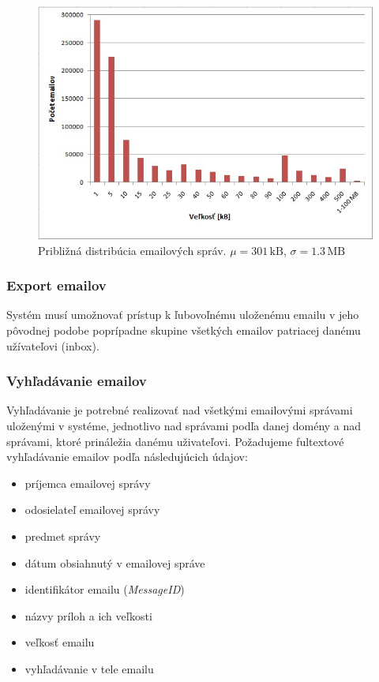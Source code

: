 \documentclass[11pt,twoside,a4paper]{book}
\begin{document}
\begin{figure}[h]
 \centering
 \includegraphics[width=12cm]{./figures/emailsHist.png}
 \caption{Približná distribúcia emailových správ. $\mu = 301\,\mathrm{kB}$, $\sigma = 1.3\,\mathrm{MB}$}
 \label{fig:emailHist}
\end{figure}


\subsubsection*{Export emailov}
Systém musí umožnovať prístup k ľubovoľnému uloženému emailu v jeho pôvodnej podobe poprípadne skupine všetkých emailov patriacej danému užívateľovi (inbox).

\subsubsection*{Vyhľadávanie emailov}
Vyhľadávanie je potrebné realizovať nad všetkými emailovými správami uloženými v systéme, jednotlivo nad správami podľa danej domény a nad správami, ktoré prináležia danému uživateľovi. Požadujeme fultextové vyhľadávanie emailov podľa následujúcich údajov:
\begin{itemize}
 \item
  príjemca emailovej správy
 \item
  odosielateľ emailovej správy
 \item
  predmet správy
 \item
  dátum obsiahnutý v emailovej správe
 \item
  identifikátor emailu (\emph{MessageID})
 \item
  názvy príloh a ich veľkosti %
 \item
  veľkosť emailu
 \item
  vyhľadávanie v tele emailu
\end{itemize}
\end{document}
